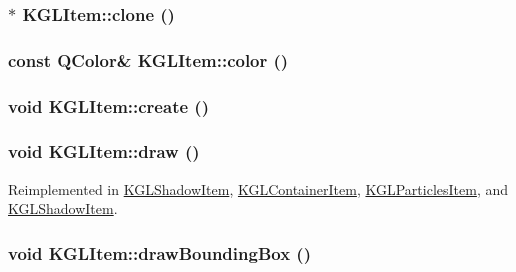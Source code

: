 \hypertarget{class_k_g_l_item_59c3205b918efb873fb011d4b676d2cd}{
\subsubsection[{clone}]{ $\ast$ KGLItem::clone ()}}
\label{class_k_g_l_item_59c3205b918efb873fb011d4b676d2cd}


\hypertarget{class_k_g_l_item_cc12f268b3573be5aa6cb9aeb64723aa}{
\subsubsection[{color}]{\setlength{\rightskip}{0pt plus 5cm}const QColor\& KGLItem::color ()}}
\label{class_k_g_l_item_cc12f268b3573be5aa6cb9aeb64723aa}


\hypertarget{class_k_g_l_item_bf80656de9729f6e5c0519ecb1a2301b}{
\subsubsection[{create}]{\setlength{\rightskip}{0pt plus 5cm}void KGLItem::create ()}}
\label{class_k_g_l_item_bf80656de9729f6e5c0519ecb1a2301b}


\hypertarget{class_k_g_l_item_4e4766cf0362fa050bffdf5f45d6d13f}{
\subsubsection[{draw}]{\setlength{\rightskip}{0pt plus 5cm}void KGLItem::draw ()}}
\label{class_k_g_l_item_4e4766cf0362fa050bffdf5f45d6d13f}




Reimplemented in \hyperlink{class_k_g_l_shadow_item_97433b863559d8f38199fe68a5b21bcc}{KGLShadowItem}, \hyperlink{class_k_g_l_container_item_a785dc67935db5f335c74e4a7fb685b9}{KGLContainerItem}, \hyperlink{class_k_g_l_particles_item_ce6df2f63f0566993f075f7ce55bb714}{KGLParticlesItem}, and \hyperlink{class_k_g_l_shadow_item_97433b863559d8f38199fe68a5b21bcc}{KGLShadowItem}.\hypertarget{class_k_g_l_item_6b5f40aeec53896189e8dd4f8fefb76b}{
\subsubsection[{drawBoundingBox}]{\setlength{\rightskip}{0pt plus 5cm}void KGLItem::drawBoundingBox ()}}
\label{class_k_g_l_item_6b5f40aeec53896189e8dd4f8fefb76b}


